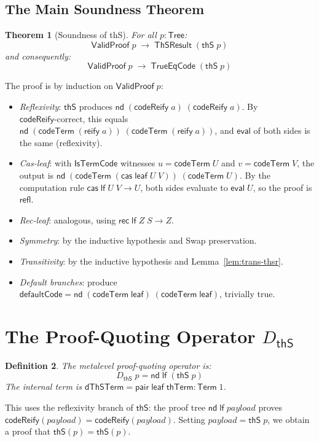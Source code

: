 \documentclass[11pt]{article}
\newtheorem{theorem}{Theorem}
\newtheorem{definition}[theorem]{Definition}
\newcommand{\lf}{\mathsf{lf}}
\newcommand{\nd}{\mathsf{nd}}
\newcommand{\cas}{\mathsf{cas}}
\newcommand{\rec}{\mathsf{rec}}
\newcommand{\eval}{\mathsf{eval}}
\newcommand{\reify}{\mathsf{reify}}
\newcommand{\codeTerm}{\mathsf{codeTerm}}
\newcommand{\codeReify}{\mathsf{codeReify}}
\newcommand{\thS}{\mathsf{thS}}
\newcommand{\thTerm}{\mathsf{thTerm}}
\newcommand{\Tree}{\mathsf{Tree}}
\newcommand{\Term}{\mathsf{Term}}
\newcommand{\dThS}{D_{\thS}}
\newcommand{\ValidProof}{\mathsf{ValidProof}}
\newcommand{\ThSResult}{\mathsf{ThSResult}}
\newcommand{\TrueEqCode}{\mathsf{TrueEqCode}}
\newcommand{\IsTermCode}{\mathsf{IsTermCode}}
\begin{document}
\subsection{The Main Soundness Theorem}

\begin{theorem}[Soundness of thS]\label{thm:soundness}
For all $p : \Tree$:
\[
  \ValidProof\;p \;\to\; \ThSResult\;(\thS\;p)
\]
and consequently:
\[
  \ValidProof\;p \;\to\; \TrueEqCode\;(\thS\;p)
\]
\end{theorem}

\noindent The proof is by induction on $\ValidProof\;p$:
\begin{itemize}
  \item \emph{Reflexivity}: $\thS$ produces $\nd\;(\codeReify\;a)\;(\codeReify\;a)$.
    By $\codeReify\text{-correct}$, this equals
    $\nd\;(\codeTerm\;(\reify\;a))\;(\codeTerm\;(\reify\;a))$, and $\eval$ of
    both sides is the same (reflexivity).
  \item \emph{Cas-leaf}: with $\IsTermCode$ witnesses $u = \codeTerm\;U$ and
    $v = \codeTerm\;V$, the output is
    $\nd\;(\codeTerm\;(\cas\;\mathsf{leaf}\;U\;V))\;(\codeTerm\;U)$.
    By the computation rule $\cas\;\lf\;U\;V \to U$, both sides evaluate
    to $\eval\;U$, so the proof is $\mathsf{refl}$.
  \item \emph{Rec-leaf}: analogous, using $\rec\;\lf\;Z\;S \to Z$.
  \item \emph{Symmetry}: by the inductive hypothesis and Swap preservation.
  \item \emph{Transitivity}: by the inductive hypothesis and Lemma~\ref{lem:trans-thsr}.
  \item \emph{Default branches}: produce $\mathsf{defaultCode} = \nd\;(\codeTerm\;\mathsf{leaf})\;(\codeTerm\;\mathsf{leaf})$,
    trivially true.
\end{itemize}

\section{The Proof-Quoting Operator $\dThS$}

\begin{definition}
The metalevel proof-quoting operator is:
\[
  \dThS\;p = \nd\;\lf\;(\thS\;p)
\]
The internal term is $\mathsf{dThSTerm} = \mathsf{pair}\;\mathsf{leaf}\;\thTerm : \Term\;1$.
\end{definition}

\noindent This uses the reflexivity branch of $\thS$: the proof tree
$\nd\;\lf\;\mathit{payload}$ proves $\codeReify(\mathit{payload}) = \codeReify(\mathit{payload})$.
Setting $\mathit{payload} = \thS\;p$, we obtain a proof that $\thS(p) = \thS(p)$.
\end{document}
